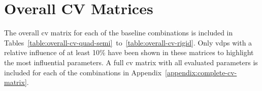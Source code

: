 
\section{Overall CV Matrices}\label{sec:results-overall}

The overall \gls{cv} matrix for each of the baseline combinations is included in Tables~\ref{table:overall-cv-quad-semi}~to~\ref{table:overall-cv-rigid}. Only \glspl{vdp} with a relative influence of at least 10\% have been shown in these matrices to highlight the most influential parameters. A full \gls{cv} matrix with all evaluated parameters is included for each of the combinations in Appendix~\ref{appendix:complete-cv-matrix}.


